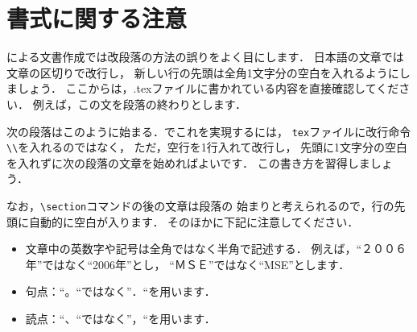 \documentclass[twocolumn]{jsarticle}
\begin{document}
\section{書式に関する注意}
\LaTeXe による文書作成では改段落の方法の誤りをよく目にします．
日本語の文章では文章の区切りで改行し，
新しい行の先頭は全角1文字分の空白を入れるようにしましょう．
ここからは，.texファイルに書かれている内容を直接確認してください．
例えば，この文を段落の終わりとします．

次の段落はこのように始まる．\LaTeXe でこれを実現するには，
\texttt{tex}ファイルに改行命令\verb+\\+を入れるのではなく，
ただ，空行を1行入れて改行し，
先頭に1文字分の空白を入れずに次の段落の文章を始めればよいです．
この書き方を習得しましょう．

なお，\verb+\section+コマンドの後の文章は段落の
始まりと考えられるので，行の先頭に自動的に空白が入ります．
そのほかに下記に注意してください．
\begin{itemize}
\item 文章中の英数字や記号は全角ではなく半角で記述する．
  例えば，``２００６年''ではなく``2006年''とし，
  ``ＭＳＥ''ではなく``MSE''とします．
\item 句点：``。``ではなく''．``を用います．
\item 読点：``、``ではなく''，``を用います．
\end{itemize}
\end{document}
